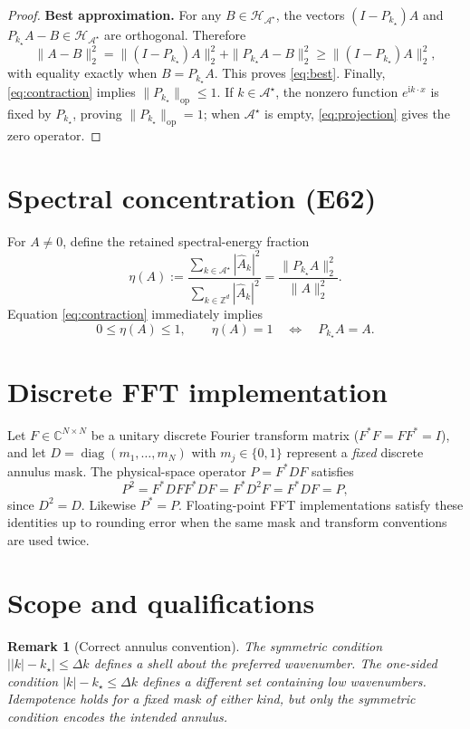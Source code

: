 \documentclass[11pt]{article}
\newtheorem{remark}{Remark}
\newcommand{\ZZ}{\mathbb{Z}}
\newcommand{\calA}{\mathcal{A}^{\star}}
\newcommand{\calH}{\mathcal{H}_{\calA}}
\newcommand{\PA}{P_{k_{\star}}}
\newcommand{\ii}{\mathrm{i}}
\begin{document}
\begin{proof}
\medskip\noindent
\textbf{Best approximation.}
For any $B\in\calH$, the vectors $(I-\PA)A$ and
$\PA A-B\in\calH$ are orthogonal.  Therefore
\begin{equation}
\|A-B\|_{2}^{2}
 =\|(I-\PA)A\|_{2}^{2}+\|\PA A-B\|_{2}^{2}
 \geq\|(I-\PA)A\|_{2}^{2},
\end{equation}
with equality exactly when $B=\PA A$.  This proves \eqref{eq:best}.
Finally, \eqref{eq:contraction} implies $\|\PA\|_{\mathrm{op}}\leq1$.
If $k\in\calA$, the nonzero function $e^{\ii k\cdot x}$ is fixed
by $\PA$, proving $\|\PA\|_{\mathrm{op}}=1$; when $\calA$ is empty,
\eqref{eq:projection} gives the zero operator.
\end{proof}

\section{Spectral concentration (E62)}
For $A\neq0$, define the retained spectral-energy fraction
\begin{equation}
\eta(A):=\frac{\sum_{k\in\calA}|\widehat A_k|^{2}}
                 {\sum_{k\in\ZZ^d}|\widehat A_k|^{2}}
       =\frac{\|\PA A\|_{2}^{2}}{\|A\|_{2}^{2}}.
\end{equation}
Equation \eqref{eq:contraction} immediately implies
\begin{equation}
0\leq\eta(A)\leq1,
\qquad
\eta(A)=1\quad\Longleftrightarrow\quad \PA A=A.
\end{equation}

\section{Discrete FFT implementation}
Let $F\in\mathbb{C}^{N\times N}$ be a unitary discrete Fourier
transform matrix ($F^{*}F=FF^{*}=I$), and let
$D=\operatorname{diag}(m_1,\ldots,m_N)$ with $m_j\in\{0,1\}$
represent a \emph{fixed} discrete annulus mask.  The physical-space
operator $P=F^{*}DF$ satisfies
\begin{equation}
P^{2}=F^{*}DF F^{*}DF=F^{*}D^{2}F=F^{*}DF=P,
\end{equation}
since $D^{2}=D$.  Likewise $P^{*}=P$.  Floating-point FFT
implementations satisfy these identities up to rounding error when
the same mask and transform conventions are used twice.

\section{Scope and qualifications}
\begin{remark}[Correct annulus convention]
The symmetric condition $\bigl||k|-k_{\star}\bigr|\leq\Delta k$
defines a shell about the preferred wavenumber.  The one-sided condition
$|k|-k_{\star}\leq\Delta k$ defines a different set containing low
wavenumbers.  Idempotence holds for a fixed mask of either kind, but
only the symmetric condition encodes the intended annulus.
\end{remark}
\end{document}
